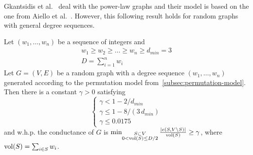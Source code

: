 Gkantsidis et al.~\cite{gms03} deal with the power-law graphs
and their model is based on the one from Aiello et al.~\cite{acl01}.
However, this following result holds for random graphs with general degree sequences.

\begin{theorem}
    \label{thm:gms}
    Let $(w_1,\ldots,w_n)$ be a sequence of integers and
    \begin{gather}
        w_1\geq w_2\geq \ldots\geq w_n\geq d_{min}=3\\
        D=\sum_{i=1}^{n}{w_i} %
    \end{gather}
    Let $G=(V,E)$ be a random graph with a degree sequence $(w_1,\ldots,w_n)$
    generated according to the permutation model from~\autoref{subsec:permutation-model}.
    Then there is a constant $\gamma>0$ satisfying
    \begin{equation}
        \begin{cases}
            \gamma<1-2/d_{min}\\
            \gamma\leq1-8/(3\,d_{min})\\
            \gamma\leq 0.0175
        \end{cases}
    \end{equation}
    and w.h.p. the conductance of $G$ is
    $\min_{\substack{S\subset V\\0<\operatorname*{vol}(S)\leq D/2}}
    \frac{|e(S,V\backslash S)|}{\operatorname*{vol}(S)}\geq\gamma$,
    where $\operatorname*{vol}(S)=\sum_{i\in S}{w_i}$.
\end{theorem}

